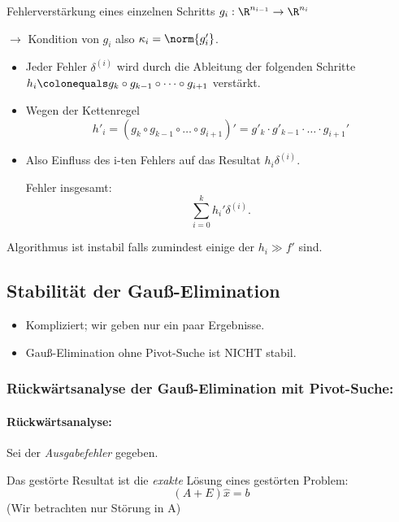 Fehlerverstärkung eines einzelnen Schritts $g_i:\R^{n_{i-1}} \to \R^{n_i}$

\medskip

\qquad$\rightarrow$ Kondition von $g_i$ also $\kappa_i = \norm{g_i'}$.

\begin{itemize}
  \item Jeder Fehler $\delta^{(i)}$ wird durch die Ableitung der folgenden Schritte
   $h_i \colonequals g_k \circ g_{k-1}\circ \dots \circ g_{i+1} $ verstärkt.

  \item Wegen der Kettenregel \[h'_i = (g_k\circ g_{k-1}\circ \dots\circ g_{i+1})' = g'_k\cdot g'_{k-1}\cdot\dots\cdot g_{i+1}'\]
  \item Also Einfluss des i-ten Fehlers auf das Resultat $h_i\delta^{(i)}$.

  Fehler insgesamt:
  \[
   \sum_{i=0}^k h_i'\delta^{(i)}.
  \]
\end{itemize}

Algorithmus ist instabil falls zumindest einige der $h_i \gg f'$ sind.

\subsection{Stabilität der Gauß-Elimination}

\begin{itemize}
 \item Kompliziert; wir geben nur ein paar Ergebnisse.

 \item Gauß-Elimination ohne Pivot-Suche ist NICHT stabil.
\end{itemize}

\subsubsection{Rückwärtsanalyse der Gauß-Elimination mit Pivot-Suche:}

\paragraph{Rückwärtsanalyse:} Sei der \emph{Ausgabefehler} gegeben.

Das gestörte Resultat ist die \emph{exakte} Lösung eines gestörten Problem:
\begin{equation*}
 (A +E) \hat{x} = b
\end{equation*}
(Wir betrachten nur Störung in A)

